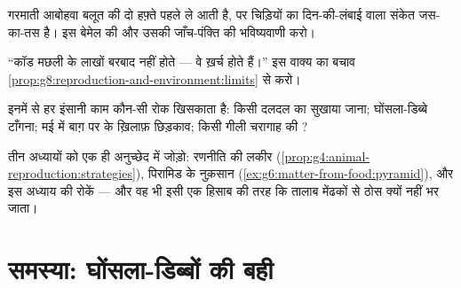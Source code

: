 \begin{exercise}[$\star\star$]\label{exo:g8:reproduction-and-environment:9}
गरमाती आबोहवा बलूत की  दो हफ़्ते पहले ले आती है, पर चिड़ियों का
दिन-की-लंबाई वाला संकेत जस-का-तस है। इस बेमेल की और उसकी जाँच-पंक्ति
की भविष्यवाणी करो।
\end{exercise}

\begin{exercise}[$\star\star$]\label{exo:g8:reproduction-and-environment:10}
``कॉड मछली के लाखों बरबाद नहीं होते --- वे ख़र्च होते हैं।'' इस वाक्य
का बचाव \cref{prop:g8:reproduction-and-environment:limits} से करो।
\end{exercise}

\begin{exercise}[$\star\star$]\label{exo:g8:reproduction-and-environment:11}
इनमें से हर इंसानी काम कौन-सी रोक खिसकाता है: किसी दलदल का सुखाया
जाना; घोंसला-डिब्बे टाँगना; मई में बाग़ पर  के ख़िलाफ़ छिड़काव;
किसी गीली चरागाह की ?
\end{exercise}

\begin{exercise}[$\star\star\star$]\label{exo:g8:reproduction-and-environment:12}
तीन अध्यायों को एक ही अनुच्छेद में जोड़ो: रणनीति की लकीर
(\cref{prop:g4:animal-reproduction:strategies}), पिरामिड के नुक़सान
(\cref{ex:g6:matter-from-food:pyramid}), और इस अध्याय की रोकें ---
और वह भी इसी एक हिसाब की तरह कि तालाब मेंढकों से ठोस क्यों नहीं भर
जाता।
\end{exercise}

\section{समस्या: घोंसला-डिब्बों की बही}

